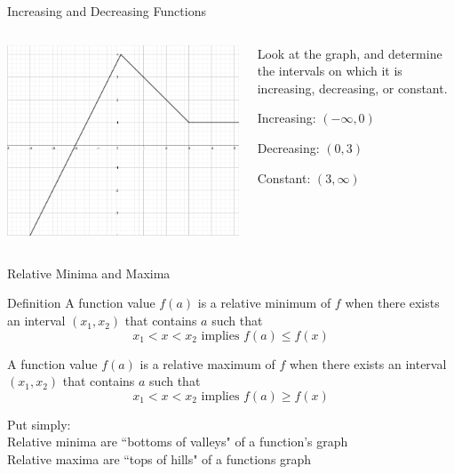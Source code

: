 \documentclass{beamer}
\begin{document}
\begin{frame}{Increasing and Decreasing Functions}
\begin{columns}
\begin{column}{0.5\textwidth}
\includegraphics[width=\textwidth]{Graph2.png}
\end{column}
\begin{column}{0.5\textwidth}
Look at the graph, and determine the intervals on which it is increasing, decreasing, or constant. \vspace{12pt}

\pause Increasing: $(-\infty, 0)$ \vspace{12pt}

\pause Decreasing: $(0, 3)$ \vspace{12pt}

\pause Constant: $(3, \infty)$
\end{column}
\end{columns}
\end{frame}

\begin{frame}[t]{Relative Minima and Maxima}
\begin{block}{Definition}
A function value $f(a)$ is a relative minimum of $f$ when there exists an interval $(x_1,x_2)$ that contains $a$ such that $$x_1 < x < x_2 \text{ implies } f(a) \leq f(x)$$

A function value $f(a)$ is a relative maximum of $f$ when there exists an interval $(x_1,x_2)$ that contains $a$ such that $$x_1 < x < x_2 \text{ implies } f(a) \geq f(x)$$
\end{block}

\pause

Put simply: \\
Relative minima are ``bottoms of valleys" of a function's graph \\
Relative maxima are ``tops of hills" of a functions graph

\end{frame}
\end{document}
